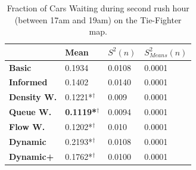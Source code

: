 \documentclass[11pt]{article}
\begin{document}
\begin{table}[H]
\centering
\caption{Fraction of Cars Waiting during second rush hour (between 17am and 19am) on the Tie-Fighter map.}
\label{my-label}
\begin{tabular}{l|l|l|l|}
\textbf{}                 & \textbf{Mean} & \textbf{$S^2(n)$} & \textbf{$S_{Means}^2(n)$} \\
\hline\textbf{Basic}      & 0.1934          & 0.0108            & 0.0001                     \\
\textbf{Informed}   & 0.1402          & 0.0140            & 0.0001                     \\
\hline\textbf{Density W.} & 0.1221*$^\dagger$          & 0.009             & 0.0001                     \\
\textbf{Queue W.}   & \textbf{0.1119*$^\dagger$} & 0.0094            & 0.0001                     \\
\textbf{Flow W.}    & 0.1202*$^\dagger$          & 0.010             & 0.0001                     \\
\textbf{Dynamic}    & 0.2193*$^\dagger$         & 0.0108            & 0.0001                     \\
\textbf{Dynamic+}   & 0.1762*$^\dagger$          & 0.0100            & 0.0001                    
\end{tabular}
\end{table}

\clearpage
\end{document}
